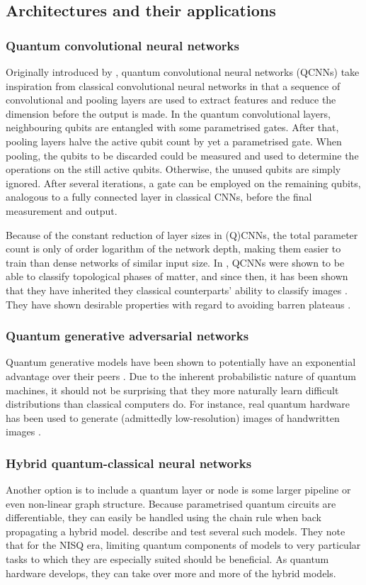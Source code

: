 \subsection{Architectures and their applications}
\subsubsection{Quantum convolutional neural networks}
Originally introduced by \textcite{cong2019}, quantum convolutional neural networks (QCNNs) take inspiration from classical convolutional neural networks in that a sequence of convolutional and pooling layers are used to extract features and reduce the dimension before the output is made. In the quantum convolutional layers, neighbouring qubits are entangled with some parametrised gates. After that, pooling layers halve the active qubit count by yet a parametrised gate. When pooling, the qubits to be discarded could be measured and used to determine the operations on the still active qubits. Otherwise, the unused qubits are simply ignored. After several iterations, a gate can be employed on the remaining qubits, analogous to a fully connected layer in classical CNNs, before the final measurement and output.

Because of the constant reduction of layer sizes in (Q)CNNs, the total parameter count is only of order logarithm of the network depth, making them easier to train than dense networks of similar input size. In \cite{cong2019}, QCNNs were shown to be able to classify topological phases of matter, and since then, it has been shown that they have inherited they classical counterparts' ability to classify images \cite{oh2020}. They have shown desirable properties with regard to avoiding barren plateaus \cite{pesah2021}.

\subsubsection{Quantum generative adversarial networks}
Quantum generative models have been shown to potentially have an exponential advantage over their peers \cite{gao2018}. Due to the inherent probabilistic nature of quantum machines, it should not be surprising that they more naturally learn difficult distributions than classical computers do. For instance, real quantum hardware has been used to generate (admittedly low-resolution) images of handwritten images \cite{huang2021}.


\subsubsection{Hybrid quantum-classical neural networks}
Another option is to include a quantum layer or node is some larger pipeline or even non-linear graph structure. Because parametrised quantum circuits are differentiable, they can easily be handled using the chain rule when back propagating a hybrid model. \textcite{killoran2019} describe and test several such models. They note that for the NISQ era, limiting quantum components of models to very particular tasks to which they are especially suited should be beneficial. As quantum hardware develops, they can take over more and more of the hybrid models.

